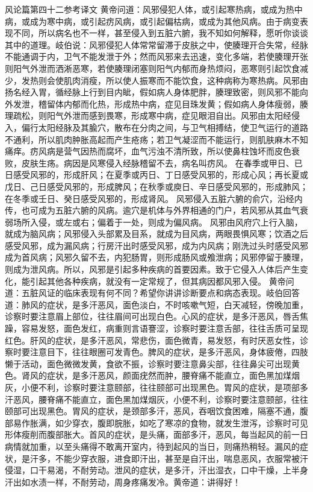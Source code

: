 \documentclass[12pt,UTF8]{ctexbook}
\begin{document}
风论篇第四十二参考译文
黄帝问道：风邪侵犯人体，或引起寒热病，或成为热中病，或成为寒中病，或引起疠风病，或引起偏枯病，或成为其他风病。由于病变表现不同，所以病名也不一样，甚至侵入到五脏六腑，我不知如何解释，愿听你谈谈其中的道理。岐伯说：风邪侵犯人体常常留滞于皮肤之中，使腠理开合失常，经脉不能通调于内，卫气不能发泄于外；然而风邪来去迅速，变化多端，若使腠理开张则阳气外泄而洒淅恶寒，若使腠理闭塞则阳气内郁而身热烦闷，恶寒则引起饮食减少，发热则会使肌肉消瘦，所以使人振寒而不能饮食，这种病称为寒热病。风邪由扬名经入胃，循经脉上行到目内眦，假如病人身体肥胖，腠理致密，则风邪不能向外发泄，稽留体内郁而化热，形成热中病，症见目珠发黄；假如病人身体瘦弱，腠理疏松，则阳气外泄而感到畏寒，形成寒中病，症见眼泪自出。风邪由太阳经侵入，偏行太阳经脉及其腧穴，散布在分肉之间，与卫气相搏结，使卫气运行的道路不通利，所以肌肉肿胀高起而产生疮疡；若卫气凝涩而不能运行，则肌肤麻木不知痛痒。疠风病是营气因热而腐坏，血气污浊不清所致，所以使鼻柱蚀坏而皮色衰败，皮肤生疡。病因是风寒侵入经脉稽留不去，病名叫疠风。
在春季或甲日、已日感受风邪的，形成肝风；在夏季或丙日、丁日感受风邪的，形成心风；再长夏或戊日、己日感受风邪的，形成脾风；在秋季或庾日、辛日感受风邪的，形成肺风；在冬季或壬日、癸日感受风邪的，形成肾风。
风邪侵入五脏六腑的俞穴，沿经内传，也可成为五脏六腑的风病。逾穴是机体与外界相通的门户，若风邪从其血气衰弱场所入侵，或左或右；偏着于一处，则成为偏风病。
风邪由风府穴上行入脑，就成为脑风病；风邪侵入头部累及目系，就成为目风病，两眼畏惧风寒；饮酒之后感受风邪，成为漏风病；行房汗出时感受风邪，成为内风病；刚洗过头时感受风邪成为首风病；风邪久留不去，内犯肠胃，则形成肠风或飧泄病；风邪停留于腠理，则成为泄风病。所以，风邪是引起多种疾病的首要因素。致于它侵入人体后产生变化，能引起其他各种疾病，就没有一定常规了，但其病因都风邪入侵。
黄帝问道：五脏风证的临床表现有何不同？希望你讲讲诊断要点和病态表现。岐伯回答道：肺风的症状，是多汗恶风，面色淡白，不时咳嗽气短，白天减轻，傍晚加重，诊察时要注意眉上部位，往往眉间可出现白色。心风的症状，是多汗恶风，唇舌焦躁，容易发怒，面色发红，病重则言语謇涩，诊察时要注意舌部，往往舌质可呈现红色。肝风的症状，是多汗恶风，常悲伤，面色微青，易发怒，有时厌恶女性，诊察时要注意目下，往往眼圈可发青色。脾风的症状，是多汗恶风，身体疲倦，四肢懒于活动，面色微微发黄，食欲不振，诊察时要注意鼻尖部，往往鼻尖可出现黄色。肾风的症状，是多汗恶风，颜面疣然而肿，腰脊痛不能直立，面色黑加煤烟灰，小便不利，诊察时要注意颐部，往往颐部可出现黑色。胃风的症状，是项部多汗恶风，腰脊痛不能直立，面色黑加煤烟灰，小便不利，诊察时要注意颐部，往往颐部可出现黑色。胃风的症状，是颈部多汗，恶风，吞咽饮食困难，隔塞不通，腹部易作胀满，如少穿衣，腹即脘胀，如吃了寒凉的食物，就发生泄泻，诊察时可见形体瘦削而腹部胀大。首风的症状，是头痛，面部多汗，恶风，每当起风的前一日病情就加重，以至头痛得不敢离开室内，待到起风的当日，则痛热稍轻。漏风的症状，是汗多，不能少穿衣服，进食即汗出，甚至是自汗出，喘息恶风，衣服常被汗侵湿，口干易渴，不耐劳动。泄风的症状，是多汗，汗出湿衣，口中干燥，上半身汗出如水渍一样，不耐劳动，周身疼痛发冷。黄帝道：讲得好！
\end{document}
